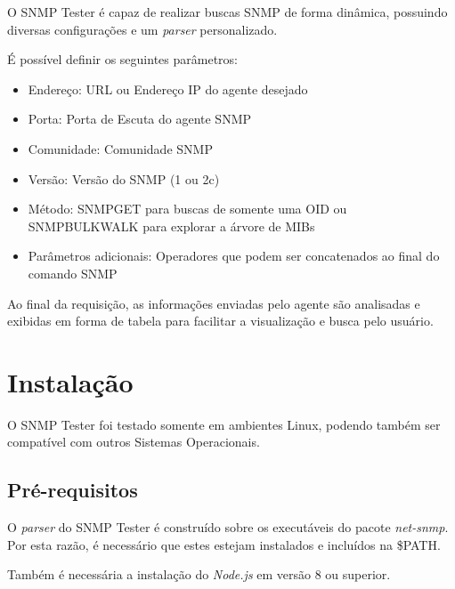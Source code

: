 \documentclass{article}
\begin{document}
\par \par O SNMP Tester é capaz de realizar buscas SNMP de forma dinâmica, possuindo diversas configurações e um \textit{parser} personalizado.

\par É possível definir os seguintes parâmetros:

\begin{itemize}
	\item Endereço: URL ou Endereço IP do agente desejado
	\item Porta: Porta de Escuta do agente SNMP
	\item Comunidade: Comunidade SNMP
        \item Versão: Versão do SNMP (1 ou 2c)
        \item Método: SNMPGET para buscas de somente uma OID ou SNMPBULKWALK para explorar a árvore de MIBs
        \item Parâmetros adicionais: Operadores que podem ser concatenados ao final do comando SNMP
\end{itemize}

\par Ao final da requisição, as informações enviadas pelo agente são analisadas e exibidas em forma de tabela para facilitar a visualização e busca pelo usuário.


\section{Instalação}

O SNMP Tester foi testado somente em ambientes Linux, podendo também ser compatível com outros Sistemas Operacionais.

\subsection{Pré-requisitos}

O \textit{parser} do SNMP Tester é construído sobre os executáveis do pacote \textit{net-snmp}. Por esta razão, é necessário que estes estejam instalados e incluídos na \$PATH.

Também é necessária a instalação do \textit{Node.js} em versão 8 ou superior.
\end{document}
